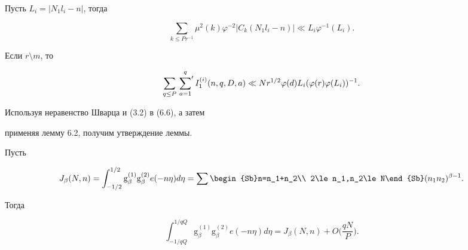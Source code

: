 \begin{lems}


Пусть $L_i=|N_1l_i-n|$, тогда


$$


\sum_{k\le Pr^{-1}}\mu^2(k)\varphi^{-2}|C_k(N_1l_i-n)|\ll


L_i\varphi^{-1}(L_i).


$$


\end{lems}





\begin{lems} Если $r\setminus m$, то


$$


\sum_{q\le P}\sideset{}{'}\sum_{a=1}^q I_1^{(i)}(n,q,D,a)\ll


Nr^{1/2}\varphi(d) L_i(\varphi(r)\varphi(L_i))^{-1}.


$$


\end{lems}





\begin{pf}


Используя неравенство Шварца и (3.2) в (6.6), а затем


применяя лемму 6.2, получим утверждение леммы.


\end{pf}





Пусть


\begin{equation}


J_\beta(N,n)=\int_{-1/2}^{1/2}\mathrm g_{\beta}^{(1)}\mathrm g_{\beta}^{(2)}


e(-n\eta)d\eta=


\sum\begin{Sb}n=n_1+n_2\\ 2\le n_1,n_2\le N\end{Sb}(n_1n_2)^{\beta-1}.


\end{equation}


Тогда


\begin{equation}


\int_{-1/qQ}^{1/qQ}\mathrm g_{\beta}^{(1)}\mathrm g_{\beta}^{(2)}


e(-n\eta)d\eta=J_\beta(N,n)+O\bigg(\frac{qN}{P}\bigg).


\end{equation}


